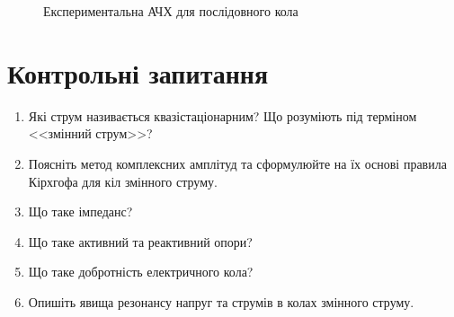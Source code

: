 \begin{figure}[!h]\centering
    
    \caption{Експериментальна АЧХ для послідовного кола}
    \label{plt:AchKh_serial}
\end{figure}

\section*{Контрольні запитання}

\begin{enumerate}
	\item Які струм називається квазістаціонарним? Що розуміють під терміном <<змінний струм>>?
	\item Поясніть метод комплексних амплітуд та сформулюйте на їх основі правила Кірхгофа для кіл змінного струму.
	\item Що таке імпеданс?
	\item Що таке активний та реактивний опори?
	\item Що таке добротність електричного кола?
	\item Опишіть явища резонансу напруг та струмів в колах змінного струму.
\end{enumerate}


